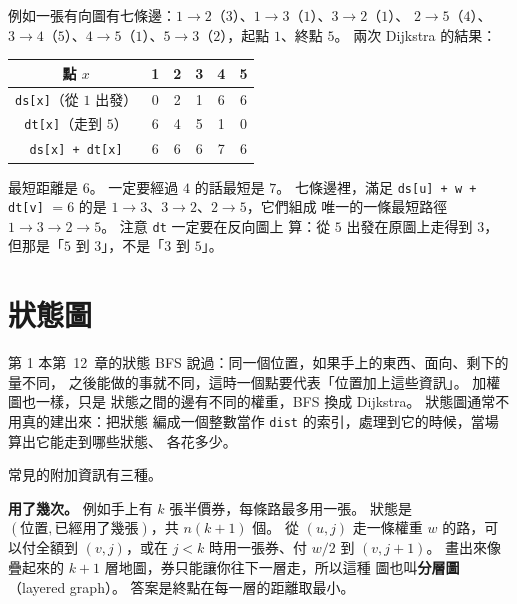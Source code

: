 例如一張有向圖有七條邊：$1 \to 2$（$3$）、$1 \to 3$（$1$）、$3 \to 2$（$1$）、
$2 \to 5$（$4$）、$3 \to 4$（$5$）、$4 \to 5$（$1$）、$5 \to 3$（$2$），起點
$1$、終點 $5$。 兩次 Dijkstra 的結果：

\begin{center}
\begin{tabular}{cccccc}
\toprule
點 $x$ & 1 & 2 & 3 & 4 & 5 \\
\midrule
\texttt{ds[x]}（從 $1$ 出發） & 0 & 2 & 1 & 6 & 6 \\
\texttt{dt[x]}（走到 $5$） & 6 & 4 & 5 & 1 & 0 \\
\texttt{ds[x] + dt[x]} & 6 & 6 & 6 & 7 & 6 \\
\bottomrule
\end{tabular}
\end{center}

最短距離是 $6$。 一定要經過 $4$ 的話最短是 $7$。 七條邊裡，滿足
\texttt{ds[u] + w + dt[v]} $= 6$ 的是 $1 \to 3$、$3 \to 2$、$2 \to 5$，它們組成
唯一的一條最短路徑 $1 \to 3 \to 2 \to 5$。 注意 \texttt{dt} 一定要在反向圖上
算：從 $5$ 出發在原圖上走得到 $3$，但那是「$5$ 到 $3$」，不是「$3$ 到 $5$」。

\section{狀態圖}
\label{sec:sp-state}

第 1 本第~12~章的狀態 BFS 說過：同一個位置，如果手上的東西、面向、剩下的量不同，
之後能做的事就不同，這時一個點要代表「位置加上這些資訊」。 加權圖也一樣，只是
狀態之間的邊有不同的權重，BFS 換成 Dijkstra。 狀態圖通常不用真的建出來：把狀態
編成一個整數當作 \texttt{dist} 的索引，處理到它的時候，當場算出它能走到哪些狀態、
各花多少。

常見的附加資訊有三種。

\textbf{用了幾次。} 例如手上有 $k$ 張半價券，每條路最多用一張。 狀態是
$(\text{位置}, \text{已經用了幾張})$，共 $n(k + 1)$ 個。 從 $(u, j)$ 走一條權重
$w$ 的路，可以付全額到 $(v, j)$，或在 $j < k$ 時用一張券、付 $w / 2$ 到
$(v, j + 1)$。 畫出來像疊起來的 $k + 1$ 層地圖，券只能讓你往下一層走，所以這種
圖也叫\textbf{分層圖}（layered graph）。 答案是終點在每一層的距離取最小。

